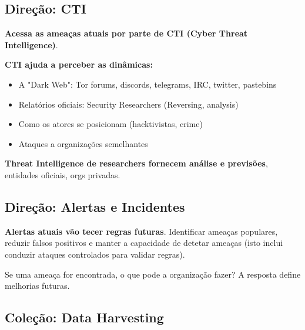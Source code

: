 \documentclass{article}
\begin{document}
\pagebreak

\subsection{Direção: CTI}

\begin{flushleft}
  \textbf{Acessa as ameaças atuais por parte de CTI (Cyber Threat Intelligence)}.

  \vspace{2mm}

  \textbf{CTI ajuda a perceber as dinâmicas:}
  \begin{itemize}
    \item A "Dark Web": Tor forums, discords, telegrams, IRC, twitter, pastebins
    \item Relatórios oficiais: Security Researchers (Reversing, analysis)
    \item Como os atores se posicionam (hacktivistas, crime)
    \item Ataques a organizações semelhantes
  \end{itemize}

  \vspace{2mm}

  \textbf{Threat Intelligence de researchers fornecem análise e previsões}, entidades
  oficiais, orgs privadas.
\end{flushleft}

\subsection{Direção: Alertas e Incidentes}

\begin{flushleft}
  \textbf{Alertas atuais vão tecer regras futuras}. Identificar ameaças populares,
  reduzir falsos positivos e manter a capacidade de detetar ameaças (isto inclui
  conduzir ataques controlados para validar regras).

  \vspace{2mm}

  Se uma ameaça for encontrada, o que pode a organização fazer? A resposta define
  melhorias futuras.
\end{flushleft}

\subsection{Coleção: Data Harvesting}
\end{document}
